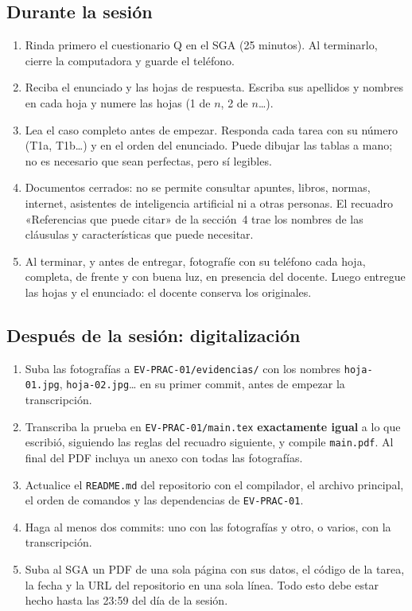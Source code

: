 \documentclass[11pt]{article}
\newcommand{\subseccion}[1]{\subsection{\textcolor{midblue}{#1}}}
\begin{document}
	\subseccion{Durante la sesión}
	
	\begin{enumerate}[leftmargin=18pt,itemsep=2pt]
		\item Rinda primero el cuestionario Q en el SGA (25 minutos). Al terminarlo, cierre la computadora y guarde el teléfono.
		\item Reciba el enunciado y las hojas de respuesta. Escriba sus apellidos y nombres en cada hoja y numere las hojas (1 de $n$, 2 de $n$\ldots).
		\item Lea el caso completo antes de empezar. Responda cada tarea con su número (T1a, T1b\ldots) y en el orden del enunciado. Puede dibujar las tablas a mano; no es necesario que sean perfectas, pero sí legibles.
		\item Documentos cerrados: no se permite consultar apuntes, libros, normas, internet, asistentes de inteligencia artificial ni a otras personas. El recuadro «Referencias que puede citar» de la sección~4 trae los nombres de las cláusulas y características que puede necesitar.
		\item Al terminar, y antes de entregar, fotografíe con su teléfono cada hoja, completa, de frente y con buena luz, en presencia del docente. Luego entregue las hojas y el enunciado: el docente conserva los originales.
	\end{enumerate}
	
	\subseccion{Después de la sesión: digitalización}
	
	\begin{enumerate}[leftmargin=18pt,itemsep=2pt]
		\item Suba las fotografías a \texttt{EV-PRAC-01/evidencias/} con los nombres \texttt{hoja-01.jpg}, \texttt{hoja-02.jpg}\ldots{} en su primer commit, antes de empezar la transcripción.
		\item Transcriba la prueba en \texttt{EV-PRAC-01/main.tex} \textbf{exactamente igual} a lo que escribió, siguiendo las reglas del recuadro siguiente, y compile \texttt{main.pdf}. Al final del PDF incluya un anexo con todas las fotografías.
		\item Actualice el \texttt{README.md} del repositorio con el compilador, el archivo principal, el orden de comandos y las dependencias de \texttt{EV-PRAC-01}.
		\item Haga al menos dos commits: uno con las fotografías y otro, o varios, con la transcripción.
		\item Suba al SGA un PDF de una sola página con sus datos, el código de la tarea, la fecha y la URL del repositorio en una sola línea. Todo esto debe estar hecho hasta las 23:59 del día de la sesión.
	\end{enumerate}
	
\end{document}
